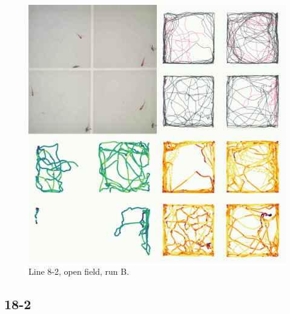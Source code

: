 \documentclass[
]{book}
\begin{document}
\begin{figure}
\includegraphics[width=1\linewidth]{figs/mikk_behaviour/four_panel_plots/open_field_20191118_1224_8-2_R_B_300} \caption{Line 8-2, open field, run B.}\label{fig:4p-8-2-of-B}
\end{figure}

\hypertarget{section-1}{%
\subsection{18-2}\label{section-1}}
\end{document}
